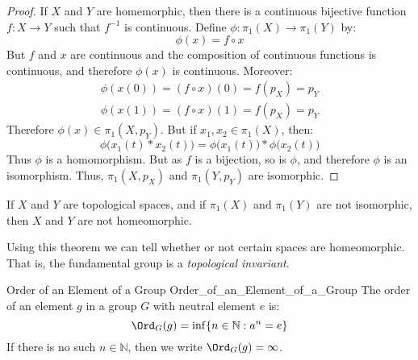             \begin{proof}
                If $X$ and $Y$ are homemorphic, then there is
                a continuous bijective function
                $f:X\rightarrow{Y}$ such that
                $f^{-1}$ is continuous. Define
                $\phi:\pi_{1}(X)\rightarrow\pi_{1}(Y)$ by:
                \begin{equation}
                    \phi(x)=f\circ{x}
                \end{equation}
                But $f$ and $x$ are continuous and the composition
                of continuous functions is continuous, and therefore
                $\phi(x)$ is continuous. Moreover:
                \begin{align}
                    \phi(x(0))=(f\circ{x})(0)=f(p_{X})=p_{Y}\\
                    \phi(x(1))=(f\circ{x})(1)=f(p_{X})=p_{Y}
                \end{align}
                Therefore $\phi(x)\in\pi_{1}(X,p_{Y})$.
                But if $x_{1},x_{2}\in\pi_{1}(X)$, then:
                \begin{equation}
                    \phi\big(x_{1}(t)*x_{2}(t)\big)
                    =\phi\big(x_{1}(t)\big)*\phi\big(x_{2}(t)\big)
                \end{equation}
                Thus
                $\phi$ is a homomorphism. But as
                $f$ is a bijection, so is $\phi$, and
                therefore $\phi$ is an isomorphism.
                Thus, $\pi_{1}(X,p_{X})$ and
                $\pi_{1}(Y,p_{Y})$ are isomorphic.
            \end{proof}
            \begin{theorem}
                If $X$ and $Y$ are topological spaces, and if $\pi_{1}(X)$ and
                $\pi_{1}(Y)$ are not isomorphic, then
                $X$ and $Y$ are not homeomorphic.
            \end{theorem}
            Using this theorem we can tell whether or not
            certain spaces are homeomorphic. That is,
            the fundamental group is a
            \textit{topological invariant}.
            \begin{ldefinition}{Order of an Element of a Group}
                               {Order_of_an_Element_of_a_Group}
                The order of an element $g$ in a group $G$
                with neutral element $e$ is:
                \begin{equation}
                    \Ord_{G}(g)=\inf\{n\in\mathbb{N}:a^{n}=e\}
                \end{equation}
                If there is no such $n\in\mathbb{N}$, then we write
                $\Ord_{G}(g)=\infty$.
            \end{ldefinition}
